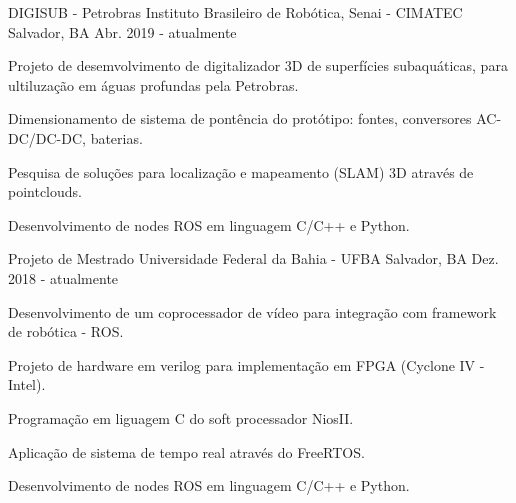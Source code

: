 

\begin{cventries}

  \cventry
    {DIGISUB - Petrobras} %
    {Instituto Brasileiro de Robótica, Senai - CIMATEC} %
    {Salvador, BA} %
    {Abr. 2019 - atualmente} %
    {
      \begin{cvitems} %
        \item {Projeto de desemvolvimento de digitalizador 3D de superfícies subaquáticas, para ultiluzação em águas profundas pela Petrobras.}
        \item {Dimensionamento de sistema de pontência do protótipo: fontes, conversores AC-DC/DC-DC, baterias.}
        \item {Pesquisa de soluções para localização e mapeamento (SLAM) 3D através de pointclouds.}
        \item {Desenvolvimento de nodes ROS em linguagem C/C++ e Python.}
      \end{cvitems}
    }


  \cventry
    {Projeto de Mestrado} %
    {Universidade Federal da Bahia - UFBA} %
    {Salvador, BA} %
    {Dez. 2018 - atualmente} %
    {
      \begin{cvitems} %
        \item {Desenvolvimento de um coprocessador de vídeo para integração com framework de robótica - ROS.}
        \item {Projeto de hardware em verilog para implementação em FPGA (Cyclone IV - Intel).}
        \item {Programação em liguagem C do soft processador NiosII.}
        \item {Aplicação de sistema de tempo real através do FreeRTOS.}
        \item {Desenvolvimento de nodes ROS em linguagem C/C++ e Python.}
      \end{cvitems}
    }


\end{cventries}
